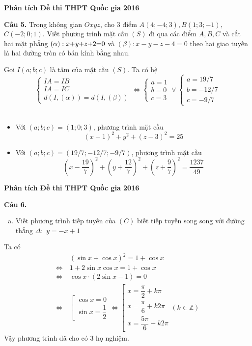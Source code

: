 \documentclass[11pt]{beamer} %
\newcommand{\cau}[2]{\begin{block}{}
		{\color{red}\textbf{Câu #1.}} #2
	\end{block}
}
\begin{document}
\begin{frame}{\textbf{\qquad Phân tích Đề thi THPT Quốc gia 2016}}~\\[-20pt]
	\cau{5}{Trong không gian $Oxyz$, cho 3 điểm $A(4;-4;3), B(1;3;-1),$ $C(-2;0;1)$. Viết phương trình mặt cầu $(S)$ đi qua các điểm $A, B, C$ và cắt hai mặt phẳng $(\alpha): \mbox{\textit{x}+\textit{y}+\textit{z}+2=0}$ và $(\beta): x-y-z-4=0$ theo hai giao tuyến là hai đường tròn có bán kính bằng nhau.}\pause
	Gọi $I(a;b;c)$ là tâm của mặt cầu $(S)$.
	Ta có hệ
	$$\begin{cases}
		IA=IB\\
		IA=IC\\
		d(I,(\alpha))=d(I,(\beta))
	\end{cases}\Leftrightarrow \begin{cases}
		a=1\\b=0\\c=3
	\end{cases}\vee \begin{cases}
		a=19/7\\
		b=-12/7\\
		c=-9/7
	\end{cases}$$~\\[-10pt]\pause
	\begin{itemize}[<+-|structure@+>]
		\item Với $(a;b;c)=(1;0;3)$, phương trình mặt cầu $$(x-1)^2+y^2+(z-3)^2=25$$
		
		
		\item  Với $(a;b;c)=(19/7;-12/7;-9/7)$, phương trình mặt cầu $$\left(x-\frac{19}{7}\right)^2+ \left(y+\frac{12}{7}\right)^2+ \left(z+\frac{9}{7}\right)^2=\frac{1237}{49}$$
	\end{itemize}
\end{frame}






\begin{frame}{\textbf{\qquad Phân tích Đề thi THPT Quốc gia 2016}}
	\cau{6}{\begin{enumerate}[a)]
			\item Viết phương trình tiếp tuyến của $(C)$ biết tiếp tuyến song song với đường thẳng $\Delta:$ $y=-x+1$
		\end{enumerate}}\pause
	Ta có 
	\begin{align*}
	&~(\sin x+\cos x)^2=1+\cos x\\
	\Leftrightarrow&~1+2\sin x\cos x=1+\cos x\\
	\Leftrightarrow&~\cos x\cdot(2\sin x-1)=0\\
	\Leftrightarrow&~\left[
	\begin{array}{l}
	\cos x=0\\[8pt]
	\sin x=\dfrac{1}{2}
	\end{array}
	\right.
	\Leftrightarrow \left[
	\begin{array}{l}
	x=\dfrac{\pi}{2}+k\pi\\[8pt]
	x=\dfrac{\pi}{6}+k2\pi\\[8pt]
	x=\dfrac{5\pi}{6}+k2\pi
	\end{array} (k\in\mathbb{Z})\right.
	\end{align*}
	Vậy phương trình đã cho có 3 họ nghiệm.
\end{frame}
\end{document}

